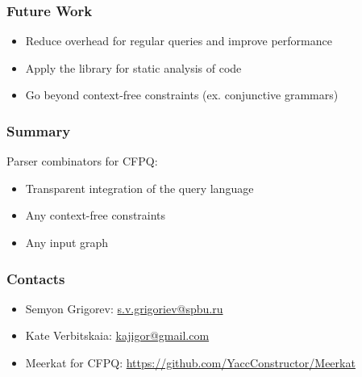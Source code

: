 \documentclass[xcolor=table]{beamer}
\begin{document}
\begin{frame}
  \transwipe[direction=90]
  \frametitle{Future Work}         
\begin{itemize}
  \item Reduce overhead for regular queries and improve performance
  \item Apply the library for static analysis of code
  \item Go beyond context-free constraints (ex. conjunctive grammars)
\end{itemize}  
\end{frame}     
            
            
\begin{frame}
  \transwipe[direction=90]
  \frametitle{Summary}  
Parser combinators for CFPQ:

\begin{itemize}
  \item Transparent integration of the query language
  \item Any context-free constraints
  \item Any input graph
\end{itemize}       
\end{frame}           
            
\begin{frame}
\transwipe[direction=90]
\frametitle{Contacts}
\begin{itemize}
  \item Semyon Grigorev: \href{mailto:s.v.grigoriev@spbu.ru}{s.v.grigoriev@spbu.ru}
  \item Kate Verbitskaia: \href{mailto:kajigor@gmail.com}{kajigor@gmail.com}
\end{itemize}
\begin{itemize}
  \item Meerkat for CFPQ: \href{https://github.com/YaccConstructor/Meerkat}{https://github.com/YaccConstructor/Meerkat}
\end{itemize}
\end{frame}
\end{document}
